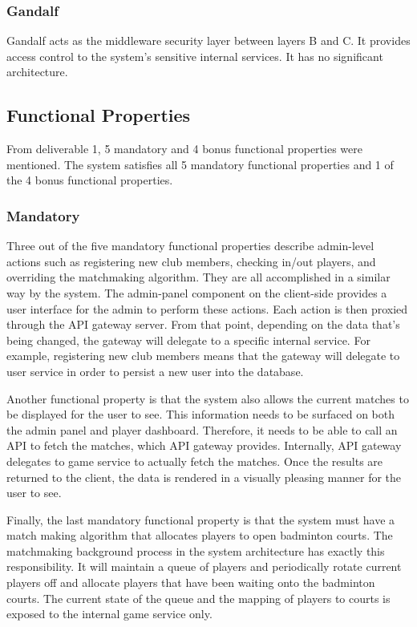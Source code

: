 \documentclass{article}
\begin{document}
\subsubsection{Gandalf}
Gandalf acts as the middleware security layer between layers B and C. It provides access control to the system's sensitive internal services. It has no significant architecture.

\subsection{Functional Properties}
From deliverable 1, 5 mandatory and 4 bonus functional properties were mentioned. The system satisfies all 5 mandatory functional properties and 1 of the 4 bonus functional properties.

\subsubsection{Mandatory}
Three out of the five mandatory functional properties describe admin-level actions such as registering new club members, checking in/out players, and overriding the matchmaking algorithm. They are all accomplished in a similar way by the system. The admin-panel component on the client-side provides a user interface for the admin to perform these actions. Each action is then proxied through the API gateway server. From that point, depending on the data that's being changed, the gateway will delegate to a specific internal service. For example, registering new club members means that the gateway will delegate to user service in order to persist a new user into the database.

Another functional property is that the system also allows the current matches to be displayed for the user to see. This information needs to be surfaced on both the admin panel and player dashboard. Therefore, it needs to be able to call an API to fetch the matches, which API gateway provides. Internally, API gateway delegates to game service to actually fetch the matches. Once the results are returned to the client, the data is rendered in a visually pleasing manner for the user to see.

Finally, the last mandatory functional property is that the system must have a match making algorithm that allocates players to open badminton courts. The matchmaking background process in the system architecture has exactly this responsibility. It will maintain a queue of players and periodically rotate current players off and allocate players that have been waiting onto the badminton courts. The current state of the queue and the mapping of players to courts is exposed to the internal game service only.
\end{document}
